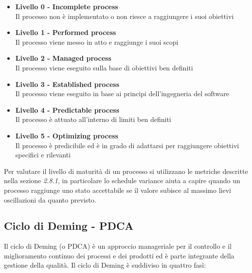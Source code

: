 {  \begin{itemize}
  \item \textbf{Livello 0 - Incomplete process}\\
    Il processo non è implementato o non riesce a raggiungere i suoi obiettivi
  \item \textbf{Livello 1 - Performed process}\\
    Il processo viene messo in atto e raggiunge i suoi scopi
  \item  \textbf{Livello 2 - Managed process}\\
    Il processo viene eseguito sulla base di obiettivi ben definiti
  \item  \textbf{Livello 3 - Established process}\\
    Il processo viene eseguito in base ai principi dell'ingegneria del software
  \item  \textbf{Livello 4 - Predictable process}\\
    Il processo è attuato all'interno di limiti ben definiti
  \item  \textbf{Livello 5 - Optimizing process}\\
    Il processo è predicibile ed è in grado di adattarsi per raggiungere obiettivi specifici e rilevanti
  \end{itemize}

  Per valutare il livello di maturità di un processo si utilizzano le
  metriche descritte nella sezione \emph{2.8.1}, in particolare lo
  schedule variance aiuta a capire quando un processo raggiunge uno
  stato accettabile se il valore subisce al massimo lievi oscillazioni
  da quanto previsto.





  \subsection{Ciclo di Deming -  PDCA}
  Il ciclo di Deming (o PDCA) è un approccio manageriale per il
  controllo e il
  miglioramento continuo dei processi e dei prodotti ed è
  parte integrante della gestione della qualità.
  Il ciclo di Deming è suddiviso in quattro fasi: \\



}
